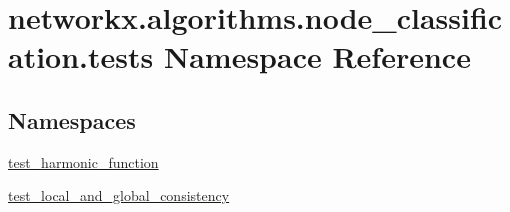 \hypertarget{namespacenetworkx_1_1algorithms_1_1node__classification_1_1tests}{}\section{networkx.\+algorithms.\+node\+\_\+classification.\+tests Namespace Reference}
\label{namespacenetworkx_1_1algorithms_1_1node__classification_1_1tests}
\subsection*{Namespaces}
\begin{DoxyCompactItemize}
\item 
 \hyperlink{namespacenetworkx_1_1algorithms_1_1node__classification_1_1tests_1_1test__harmonic__function}{test\+\_\+harmonic\+\_\+function}
\item 
 \hyperlink{namespacenetworkx_1_1algorithms_1_1node__classification_1_1tests_1_1test__local__and__global__consistency}{test\+\_\+local\+\_\+and\+\_\+global\+\_\+consistency}
\end{DoxyCompactItemize}
